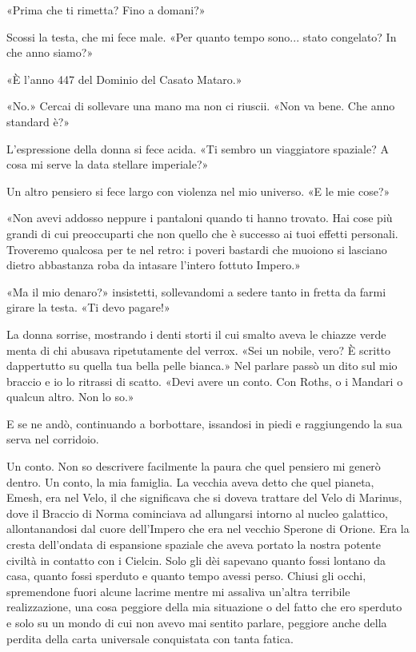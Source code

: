 «Prima che ti rimetta? Fino a domani?»

Scossi la testa, che mi fece male. «Per quanto tempo sono... stato
congelato? In che anno siamo?»

«È l'anno 447 del Dominio del Casato Mataro.»

«No.» Cercai di sollevare una mano ma non ci riuscii. «Non va bene. Che
anno standard è?»

L'espressione della donna si fece acida. «Ti sembro un viaggiatore
spaziale? A cosa mi serve la data stellare imperiale?»

Un altro pensiero si fece largo con violenza nel mio universo. «E le mie
cose?»

«Non avevi addosso neppure i pantaloni quando ti hanno trovato. Hai cose
più grandi di cui preoccuparti che non quello che è successo ai tuoi
effetti personali. Troveremo qualcosa per te nel retro: i poveri
bastardi che muoiono si lasciano dietro abbastanza roba da intasare
l'intero fottuto Impero.»

«Ma il mio denaro?» insistetti, sollevandomi a sedere tanto in fretta da
farmi girare la testa. «Ti devo pagare!»

La donna sorrise, mostrando i denti storti il cui smalto aveva le
chiazze verde menta di chi abusava ripetutamente del verrox. «Sei un
nobile, vero? È scritto dappertutto su quella tua bella pelle bianca.»
Nel parlare passò un dito sul mio braccio e io lo ritrassi di scatto.
«Devi avere un conto. Con Roths, o i Mandari o qualcun altro. Non lo
so.»

E se ne andò, continuando a borbottare, issandosi in piedi e
raggiungendo la sua serva nel corridoio.

Un conto. Non so descrivere facilmente la paura che quel {pensiero} mi
generò dentro. Un conto, la mia famiglia. La vecchia aveva detto che
quel pianeta, Emesh, era nel Velo, il che significava che si doveva
trattare del Velo di Marinus, dove il Braccio di Norma cominciava ad
allungarsi intorno al nucleo galattico, allontanandosi dal cuore
dell'Impero che era nel vecchio Sperone di Orione. Era la cresta
dell'ondata di espansione spaziale che aveva portato la nostra potente
civiltà in contatto con i Cielcin. Solo gli dèi sapevano quanto fossi
lontano da casa, quanto fossi sperduto e quanto tempo avessi perso.
Chiusi gli occhi, spremendone fuori alcune lacrime mentre mi assaliva
un'altra terribile realizzazione, una cosa peggiore della mia situazione
o del fatto che ero sperduto e solo su un mondo di cui non avevo mai
sentito parlare, peggiore anche della perdita della carta universale
conquistata con tanta fatica.

